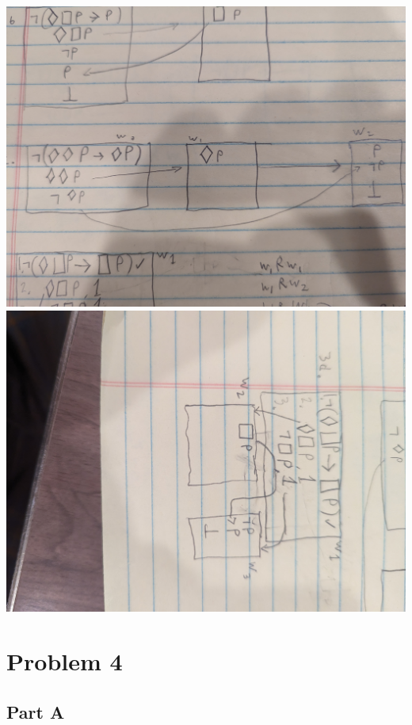\documentclass[12pt]{article}
\begin{document}
\break
\includegraphics[width=\textwidth]{3c}
\break
\includegraphics[angle=90,width=\textwidth]{3d}

\section*{Problem 4}

\subsection*{Part A}
\end{document}
